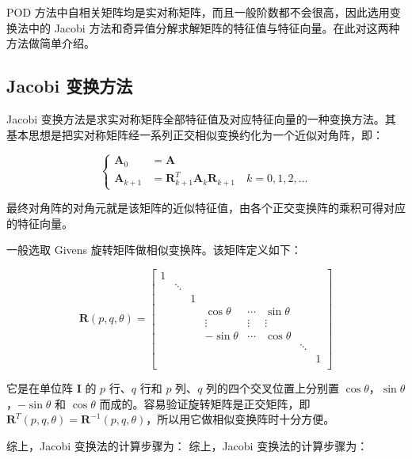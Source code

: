 POD 方法中自相关矩阵均是实对称矩阵，而且一般阶数都不会很高，因此选用变换法中的 Jacobi 方法和奇异值分解求解矩阵的特征值与特征向量。在此对这两种方法做简单介绍。

\subsection{Jacobi 变换方法}

Jacobi 变换方法是求实对称矩阵全部特征值及对应特征向量的一种变换方法。其基本思想是把实对称矩阵经一系列正交相似变换约化为一个近似对角阵，即：

\begin{equation}
\left\{
\begin{aligned}
\mathbf{A}_0 &= \mathbf{A} \\
\mathbf{A}_{k+1} &= \mathbf{R}_{k+1}^T \mathbf{A}_k \mathbf{R}_{k+1} \quad k = 0, 1, 2, \ldots
\end{aligned}
\right. \tag{2-18}
\end{equation}

最终对角阵的对角元就是该矩阵的近似特征值，由各个正交变换阵的乘积可得对应的特征向量。

一般选取 Givens 旋转矩阵做相似变换阵。该矩阵定义如下：

$$\mathbf{R}(p,q,\theta)=\begin{bmatrix} 1 & & & & & & & \\ & \ddots & & & & & & \\ & & 1 & & & & & \\ & & & \cos\theta & \cdots & \sin\theta & & \\ & & & \vdots & \vdots & \vdots & & \\ & & & -\sin\theta & \cdots & \cos\theta & & \\ & & & & & & \ddots & \\ & & & & & & & 1 \\ \end{bmatrix}$$

它是在单位阵 \(\mathbf{I}\) 的 \(p\) 行、\(q\) 行和 \(p\) 列、\(q\) 列的四个交叉位置上分别置 \(\cos\theta\)，\(\sin\theta\)，\(-\sin\theta\) 和 \(\cos\theta\) 而成的。容易验证旋转矩阵是正交矩阵，即 \(\mathbf{R}^T(p, q, \theta) = \mathbf{R}^{-1}(p, q, \theta)\)，所以用它做相似变换阵时十分方便。

综上，Jacobi 变换法的计算步骤为：
综上，Jacobi 变换法的计算步骤为：

